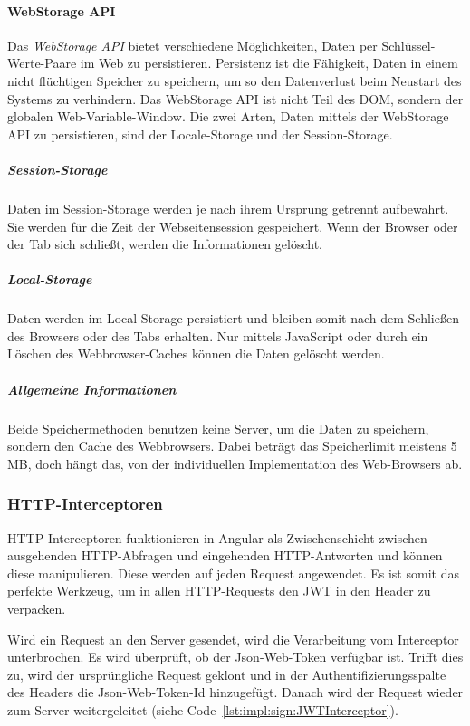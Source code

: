 \paragraph{WebStorage API}
\label{par:impl:usermanagment:WebStorage}
Das \emph{WebStorage API} bietet verschiedene Möglichkeiten, Daten per Schlüssel-Werte-Paare im Web zu persistieren. Persistenz ist die Fähigkeit, Daten in einem nicht flüchtigen Speicher zu speichern, um so den Datenverlust beim Neustart des Systems zu verhindern. Das WebStorage API ist nicht Teil des DOM, sondern der globalen Web-Variable-Window. Die zwei Arten, Daten mittels der WebStorage API zu persistieren, sind der Locale-Storage und der Session-Storage.
\cite{WikiPersistenzDefinition} \cite{WebStorageAPI}


\subparagraph{Session-Storage}
Daten im Session-Storage werden je nach ihrem Ursprung getrennt aufbewahrt. Sie werden für die Zeit der Webseitensession gespeichert. Wenn der Browser oder der Tab sich schließt, werden die Informationen gelöscht.
\cite{WebStorageAPI}

\subparagraph{Local-Storage}
Daten werden im Local-Storage persistiert und bleiben somit nach dem Schließen des Browsers oder des Tabs erhalten. Nur mittels JavaScript oder durch ein Löschen des Webbrowser-Caches können die Daten gelöscht werden.
\cite{WebStorageAPI}

\subparagraph{Allgemeine Informationen}
Beide Speichermethoden benutzen keine Server, um die Daten zu speichern, sondern den Cache des Webbrowsers. Dabei beträgt das Speicherlimit meistens 5 MB, doch hängt das, von der individuellen Implementation des Web-Browsers ab.
\cite{WebStorageAPI}

\subsubsection{HTTP-Interceptoren}
\label{sec:httpinterceptor}
HTTP-Interceptoren funktionieren in Angular als Zwischenschicht zwischen ausgehenden HTTP-Abfragen und eingehenden HTTP-Antworten und können diese manipulieren.
Diese werden auf jeden Request angewendet. Es ist somit das perfekte Werkzeug, um in allen HTTP-Requests den JWT in den Header zu verpacken.
\cite[10.3]{AngularBuch}

Wird ein Request an den Server gesendet, wird die Verarbeitung vom Interceptor unterbrochen. Es wird überprüft, ob der Json-Web-Token verfügbar ist. Trifft dies zu, wird der ursprüngliche Request geklont und in der Authentifizierungsspalte des Headers die Json-Web-Token-Id hinzugefügt. Danach wird der Request wieder zum Server weitergeleitet (siehe Code \ref{lst:impl:sign:JWTInterceptor}). 


